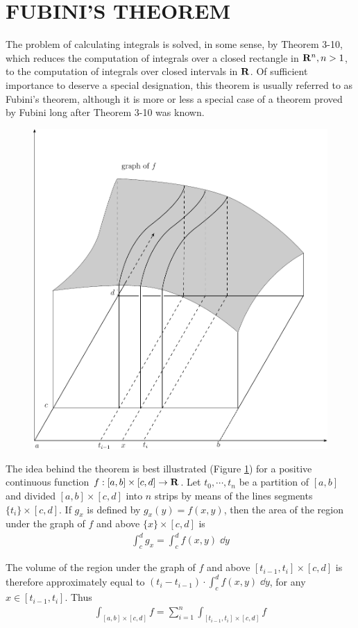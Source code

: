 \newpage
\section{FUBINI'S THEOREM}
The problem of calculating integrals is solved, in some sense,
by Theorem 3-10, which reduces the computation of integrals over a closed 
rectangle in $\mathbf{R}^n, n > 1$, to the computation of integrals over closed intervals in $\mathbf{R}$.
Of sufficient importance to deserve a special designation, this theorem is usually
referred to as Fubini's theorem, although it is more or less a special case of a 
theorem proved by Fubini long after Theorem 3-10 was known.

\begin{figure}[htb]
    \centering
    \includegraphics[width=.7\linewidth]{./pics/Fig3-2.pdf}
    \caption{}
    \label{Fig 3-2}
\end{figure}

The idea behind the theorem is best illustrated (Figure \ref{Fig 3-2})
for a positive continuous function  $f:[a,b]\times [c, d]\to \mathbf{R}$. Let $t_0, \cdots, t_n$ 
be a partition of $[a, b]$ and divided $[a, b]\times [c, d]$ into $n$ strips by means of the 
lines segments $\{t_i\}\times [c, d]$. If $g_x$ is defined by $g_x(y) = f(x, y)$, then the area 
of the region under the graph of $f$ and above $\{x\}\times [c, d]$ is 
\begin{align*}
    \int_{c }^{d}{g_x} = \int_c^df(x, y)\;\dd y
\end{align*}

The volume of the region under the graph of $f$ and above $[t_{i-1},t_i] \times [c,d]$ 
is therefore approximately equal to $(t_i-t_{i-1})\cdot \int_c^d f(x,y)\;\dd y$, for any $x\in [t_{i-1}, t_i]$.
Thus 
\begin{align*}
    \int_{[a,b]\times [c, d]} f  = \sum_{i=1}^{n}{\int_{[t_{i-1}, t_i]\times [c, d] }f }
\end{align*}

